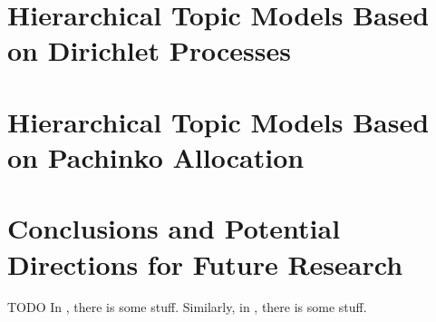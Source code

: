 \documentclass{article}
\begin{document}
\section{Hierarchical Topic Models Based on Dirichlet Processes}

\section{Hierarchical Topic Models Based on Pachinko Allocation}

\section{Conclusions and Potential Directions for Future Research}
TODO
In \cite{paisley2015nested}, there is some stuff.
Similarly, in \cite{blei2010nested}, there is some stuff.

\nocite{*}
%


\end{document}
